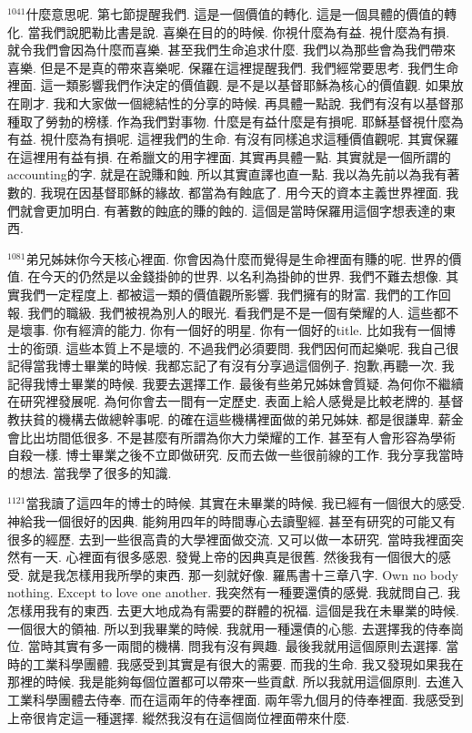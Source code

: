 \documentclass{book}
\begin{document}
$^{1041}$什麼意思呢.
第七節提醒我們.
這是一個價值的轉化.
這是一個具體的價值的轉化.
當我們說肥勒比書是說.
喜樂在目的的時候.
你視什麼為有益.
視什麼為有損.
就令我們會因為什麼而喜樂.
甚至我們生命追求什麼.
我們以為那些會為我們帶來喜樂.
但是不是真的帶來喜樂呢.
保羅在這裡提醒我們.
我們經常要思考.
我們生命裡面.
這一類影響我們作決定的價值觀.
是不是以基督耶穌為核心的價值觀.
如果放在剛才.
我和大家做一個總結性的分享的時候.
再具體一點說.
我們有沒有以基督那種取了勞勃的榜樣.
作為我們對事物.
什麼是有益什麼是有損呢.
耶穌基督視什麼為有益.
視什麼為有損呢.
這裡我們的生命.
有沒有同樣追求這種價值觀呢.
其實保羅在這裡用有益有損.
在希臘文的用字裡面.
其實再具體一點.
其實就是一個所謂的accounting的字.
就是在說賺和蝕.
所以其實直譯也直一點.
我以為先前以為我有著數的.
我現在因基督耶穌的緣故.
都當為有蝕底了.
用今天的資本主義世界裡面.
我們就會更加明白.
有著數的蝕底的賺的蝕的.
這個是當時保羅用這個字想表達的東西.

$^{1081}$弟兄姊妹你今天核心裡面.
你會因為什麼而覺得是生命裡面有賺的呢.
世界的價值.
在今天的仍然是以金錢掛帥的世界.
以名利為掛帥的世界.
我們不難去想像.
其實我們一定程度上.
都被這一類的價值觀所影響.
我們擁有的財富.
我們的工作回報.
我們的職級.
我們被視為別人的眼光.
看我們是不是一個有榮耀的人.
這些都不是壞事.
你有經濟的能力.
你有一個好的明星.
你有一個好的title.
比如我有一個博士的銜頭.
這些本質上不是壞的.
不過我們必須要問.
我們因何而起樂呢.
我自己很記得當我博士畢業的時候.
我都忘記了有沒有分享過這個例子.
抱歉,再聽一次.
我記得我博士畢業的時候.
我要去選擇工作.
最後有些弟兄姊妹會質疑.
為何你不繼續在研究裡發展呢.
為何你會去一間有一定歷史.
表面上給人感覺是比較老牌的.
基督教扶貧的機構去做總幹事呢.
的確在這些機構裡面做的弟兄姊妹.
都是很謙卑.
薪金會比出坊間低很多.
不是甚麼有所謂為你大力榮耀的工作.
甚至有人會形容為學術自殺一樣.
博士畢業之後不立即做研究.
反而去做一些很前線的工作.
我分享我當時的想法.
當我學了很多的知識.

$^{1121}$當我讀了這四年的博士的時候.
其實在未畢業的時候.
我已經有一個很大的感受.
神給我一個很好的因典.
能夠用四年的時間專心去讀聖經.
甚至有研究的可能又有很多的經歷.
去到一些很高貴的大學裡面做交流.
又可以做一本研究.
當時我裡面突然有一天.
心裡面有很多感恩.
發覺上帝的因典真是很舊.
然後我有一個很大的感受.
就是我怎樣用我所學的東西.
那一刻就好像.
羅馬書十三章八字.
Own no body nothing.
Except to love one another.
我突然有一種要還債的感覺.
我就問自己.
我怎樣用我有的東西.
去更大地成為有需要的群體的祝福.
這個是我在未畢業的時候.
一個很大的領袖.
所以到我畢業的時候.
我就用一種還債的心態.
去選擇我的侍奉崗位.
當時其實有多一兩間的機構.
問我有沒有興趣.
最後我就用這個原則去選擇.
當時的工業科學團體.
我感受到其實是有很大的需要.
而我的生命.
我又發現如果我在那裡的時候.
我是能夠每個位置都可以帶來一些貢獻.
所以我就用這個原則.
去進入工業科學團體去侍奉.
而在這兩年的侍奉裡面.
兩年零九個月的侍奉裡面.
我感受到上帝很肯定這一種選擇.
縱然我沒有在這個崗位裡面帶來什麼.
\end{document}
